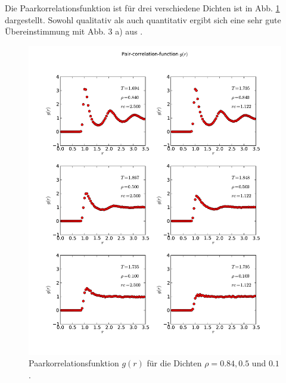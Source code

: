 \documentclass[11pt,a4paper]{article}
\begin{document}
Die Paarkorrelationsfunktion ist für drei verschiedene Dichten ist in Abb. \ref{fig:g_r} dargestellt. Sowohl qualitativ als auch quantitativ ergibt sich eine sehr gute Übereinstimmung mit Abb. 3 a) aus \cite{sperandeo}.
\begin{figure}[tbp]
 \centering
  \includegraphics[width=14cm]{../g_r}
 \caption{Paarkorrelationsfunktion $g(r)$ für die Dichten $\rho = 0.84, 0.5$ und $0.1$.}\label{fig:g_r}
\end{figure}
\end{document}
